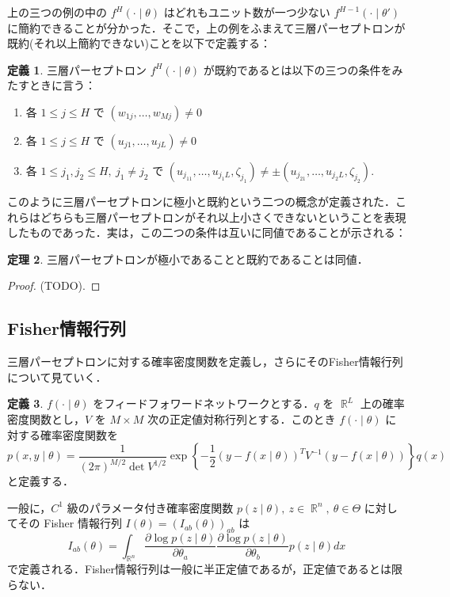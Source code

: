 \documentclass{jsarticle}
\DeclareMathOperator{\R}{\mathbb{R}}
\theoremstyle{definition}
\newtheorem{thm}{定理}[section]
\newtheorem{defn}[thm]{定義}
\begin{document}
上の三つの例の中の $f^H(\cdot\mid\theta)$ はどれもユニット数が一つ少ない $f^{H-1}(\cdot\mid\theta')$ に簡約できることが分かった．そこで，上の例をふまえて三層パーセプトロンが既約(それ以上簡約できない)ことを以下で定義する：
\begin{defn}
  三層パーセプトロン $f^H(\cdot\mid\theta)$ が既約であるとは以下の三つの条件をみたすときに言う：
  \begin{enumerate}
    \item 各 $1 \le j \le H$ で $(w_{1j}, \ldots, w_{Mj}) \neq 0$
    \item 各 $1 \le j \le H$ で $(u_{j1}, \ldots, u_{jL}) \neq 0$
    \item 各 $1 \le j_1, j_2 \le H,\ j_1 \neq j_2$ で $(u_{j_11}, \ldots, u_{j_1L}, \zeta_{j_1}) \neq \pm (u_{j_21}, \ldots, u_{j_2L}, \zeta_{j_2})$.
  \end{enumerate}
\end{defn}
このように三層パーセプトロンに極小と既約という二つの概念が定義された．これらはどちらも三層パーセプトロンがそれ以上小さくできないということを表現したものであった．実は，この二つの条件は互いに同値であることが示される：
\begin{thm}
  三層パーセプトロンが極小であることと既約であることは同値．
\end{thm}
\begin{proof}
  (TODO).
\end{proof}

\subsection{Fisher情報行列}

三層パーセプトロンに対する確率密度関数を定義し，さらにそのFisher情報行列について見ていく．

\begin{defn}
  $f(\cdot\mid\theta)$ をフィードフォワードネットワークとする．$q$ を $\R^L$ 上の確率密度関数とし，$V$ を $M\times M$ 次の正定値対称行列とする．このとき $f(\cdot\mid\theta)$ に対する確率密度関数を
  \[
    p(x,y\mid\theta) = \frac{1}{(2\pi)^{M/2}\det V^{1/2}}\exp\left\{-\frac{1}{2}(y-f(x\mid\theta))^T V^{-1} (y-f(x\mid\theta))\right\}q(x)
  \]
  と定義する．
\end{defn}

一般に，$C^1$ 級のパラメータ付き確率密度関数 $p(z\mid\theta),\ z \in \R^n,\ \theta \in \Theta$ に対してその Fisher 情報行列 $I(\theta) = (I_{ab}(\theta))_{ab}$ は
\[
  I_{ab}(\theta) = \int_{\R^n} \frac{\partial \log p(z\mid\theta)}{\partial \theta_a} \frac{\partial\log p(z\mid\theta)}{\partial \theta_b}p(z\mid\theta)dx
\]
で定義される．Fisher情報行列は一般に半正定値であるが，正定値であるとは限らない．
\end{document}
